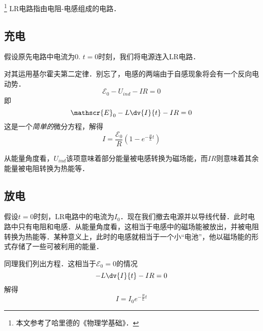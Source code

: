
\footnote{本文参考了哈里德的《物理学基础》．}
LR电路指由电阻-电感组成的电路．

\subsection{充电}
假设原先电路中电流为$0$. $t=0$时刻，我们将电源连入LR电路．

对其运用基尔霍夫第二定律．别忘了，电感的两端由于自感现象将会有一个反向电动势．
$$
\mathscr{E}_0 - U_{ind} - IR = 0
$$
即
\begin{equation}
\mathscr{E}_0 - L\dv{I}{t} - IR = 0
\end{equation}
这是一个\textsl{简单的}微分方程，解得
\begin{equation}
I = \frac{\mathscr{E}_0}{R} (1-e^{-\frac{R}{L}t})
\end{equation}

从能量角度看，$U_{ind}$该项意味着部分能量被电感转换为磁场能，而$IR$则意味着其余能量被电阻转换为热能等．

\subsection{放电}
假设$t=0$时刻，LR电路中的电流为$I_0$．现在我们撤去电源并以导线代替．此时电路中只有电阻和电感．从能量角度看，这相当于电感中的磁场能被放出，并被电阻转换为热能等．某种意义上，此时的电感就相当于一个小“电池”，他以磁场能的形式存储了一些可被利用的能量．

同理我们列出方程．这相当于$\mathscr{E}_0=0$的情况
\begin{equation}
- L\dv{I}{t} - IR = 0
\end{equation}
解得
\begin{equation}
I = I_0 e^{-\frac{R}{L}t}
\end{equation}
